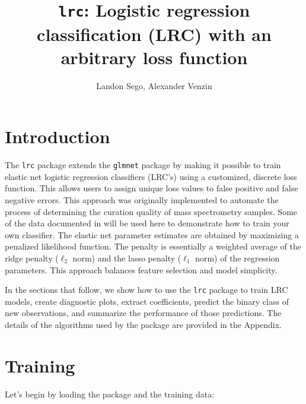 \documentclass{article}
\begin{document}
 


\title{{\tt lrc}: Logistic regression classification (LRC) with an arbitrary loss function\\}
\author{Landon Sego, Alexander Venzin}
\maketitle

\section{Introduction}

The {\tt lrc} package extends the {\tt glmnet} package by making it possible to train elastic net logistic 
regression classifiers (LRC's) using a customized, discrete loss function.  This allows users to assign unique 
loss values to false positive and false negative errors. This approach was originally implemented to automate the
process of determining the curation quality of mass spectrometry samples. Some of the data documented in 
\cite{thepaper} will be used here to demonstrate how to train your own classifier. The elastic net parameter
estimates are obtained by maximizing a penalized likelihood function. The penalty is essentially a weighted average
of the ridge penalty ($\ell_2$ norm) and the lasso penalty ($\ell_1$ norm) of the regression parameters.  This
approach balances feature selection and model simplicity. 

In the sections that follow, we show how to use the {\tt lrc} package to train LRC models, create diagnostic plots,
extract coefficients, predict the binary class of new observations, and summarize the performance of those
predictions. The details of the algorithms used by the package are provided in the Appendix.

\section{Training}

Let's begin by loading the package and the training data:
\end{document}

